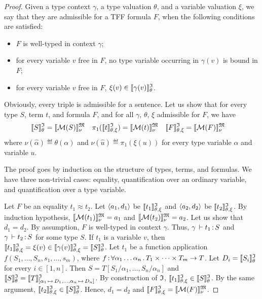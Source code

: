 \begin{proof}
Given a type context $\gamma$, a type valuation $\theta$,
and a variable valuation $\xi$, we say that they are admissible
for a TFF formula $F$, when the following conditions are satisfied:
\begin{itemize}
\item $F$ is well-typed in context $\gamma$;
\item for every variable $v$ free in $F$, no type variable
occurring in $\gamma(v)$ is bound in $F$;
\item for every variable $v$ free in $F$, $\xi(v) \in \llbracket\gamma(v)\rrbracket^{\mathfrak{I}}_{\theta}$.
\end{itemize}
Obviously, every triple is admissible for a sentence.
Let us show that for every type $S$, term $t$, and formula $F$,
and for all $\gamma$, $\theta$, $\xi$ admissible for $F$, we have
\begin{align*}
\llbracket S\rrbracket^{\mathfrak{I}}_{\theta} &= \llbracket \mathcal{M}(S) \rrbracket^{\mathfrak{M}}_{\nu} &
\pi_1(\llbracket t\rrbracket^{\mathfrak{I}}_{\theta,\xi}) &= \llbracket \mathcal{M}(t) \rrbracket^{\mathfrak{M}}_{\nu} &
\llbracket F\rrbracket^{\mathfrak{I}}_{\theta,\xi} &= \llbracket \mathcal{M}(F) \rrbracket^{\mathfrak{M}}_{\nu}
\end{align*}
where $\nu(\hat{\alpha}) \eqdef \theta(\alpha)$ and
$\nu(\hat{u}) \eqdef \pi_1(\xi(u))$
for every type variable $\alpha$ and variable $u$.

The proof goes by induction on the structure of types, terms, and formulas.
We have three non-trivial cases: equality, quantification over an ordinary
variable, and quantification over a type variable.

Let $F$ be an equality $t_1 \approx t_2$.
Let $\langle a_1, d_1 \rangle$ be $\llbracket t_1\rrbracket^{\mathfrak{I}}_{\theta,\xi}$ and $\langle a_2, d_2 \rangle$ be $\llbracket t_2\rrbracket^{\mathfrak{I}}_{\theta,\xi}$.
By induction hypothesis, $\llbracket \mathcal{M}(t_1) \rrbracket^{\mathfrak{M}}_{\nu} = a_1$ and
$\llbracket \mathcal{M}(t_2) \rrbracket^{\mathfrak{M}}_{\nu} = a_2$. Let us show that $d_1 = d_2$.
By assumption, $F$ is well-typed in context $\gamma$.
Thus, $\gamma\,\vdash t_1 \operatorname{:} S$ and $\gamma\,\vdash t_2 \operatorname{:} S$
for some type $S$.
If $t_1$ is a variable $v$, then
$\llbracket t_1\rrbracket^{\mathfrak{I}}_{\theta,\xi} = \xi(v) \in \llbracket\gamma(v)\rrbracket^{\mathfrak{I}}_{\theta,\xi} = \llbracket S\rrbracket^{\mathfrak{I}}_{\theta}$.
Let $t_1$ be a function application $f(S_1,\dots,S_n,s_1,\dots,s_m)$,
where $f \operatorname{:}
\forall \alpha_1\dots\alpha_n \,.\, T_1 \times \dots \times T_m \to T$.
Let $D_i = \llbracket S_i\rrbracket^{\mathfrak{I}}_{\theta}$ for every $i \in [1,n]$.
Then $S = T[S_1/\alpha_1,\dots,S_n/\alpha_n]$ and
$\llbracket S\rrbracket^{\mathfrak{I}}_{\theta} = \llbracket T \rrbracket^{\mathfrak{I}}_{[\alpha_1 \,\mapsto\, D_1,\dots,
\alpha_n \,\mapsto\, D_n]}$.
By construction of $\mathfrak{I}$, $\llbracket t_1\rrbracket^{\mathfrak{I}}_{\theta,\xi} \in \llbracket S\rrbracket^{\mathfrak{I}}_{\theta}$.
By the same argument, $\llbracket t_2\rrbracket^{\mathfrak{I}}_{\theta,\xi} \in \llbracket S\rrbracket^{\mathfrak{I}}_{\theta}$.
Hence, $d_1 = d_2$ and $\llbracket F\rrbracket^{\mathfrak{I}}_{\theta,\xi} = \llbracket \mathcal{M}(F) \rrbracket^{\mathfrak{M}}_{\nu}$.


\end{proof}
